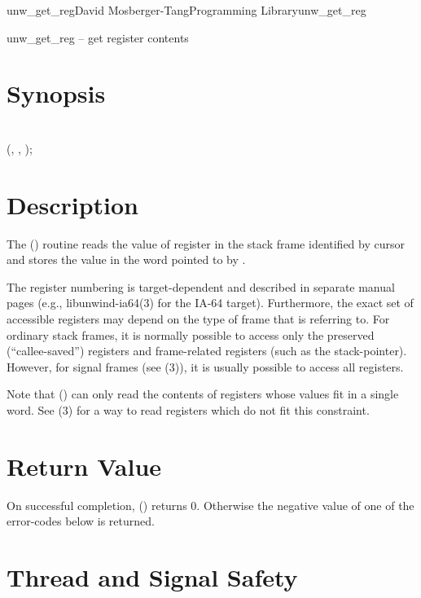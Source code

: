 \documentclass{article}
\begin{document}
\begin{Name}{3}{unw\_get\_reg}{David Mosberger-Tang}{Programming Library}{unw\_get\_reg}

  unw\_get\_reg -- get register contents
\end{Name}

\section{Synopsis}

\\

 (,  , );\\

\section{Description}

The () routine reads the value of register
 in the stack frame identified by cursor  and stores
the value in the word pointed to by .

The register numbering is target-dependent and described in separate
manual pages (e.g., libunwind-ia64(3) for the IA-64 target).
Furthermore, the exact set of accessible registers may depend on the
type of frame that  is referring to.  For ordinary stack
frames, it is normally possible to access only the preserved
(``callee-saved'') registers and frame-related registers (such as the
stack-pointer).  However, for signal frames (see
(3)), it is usually possible to access
all registers.

Note that () can only read the contents of
registers whose values fit in a single word.  See
(3) for a way to read registers which do not fit
this constraint.

\section{Return Value}

On successful completion, () returns 0.
Otherwise the negative value of one of the error-codes below is
returned.

\section{Thread and Signal Safety}
\end{document}

